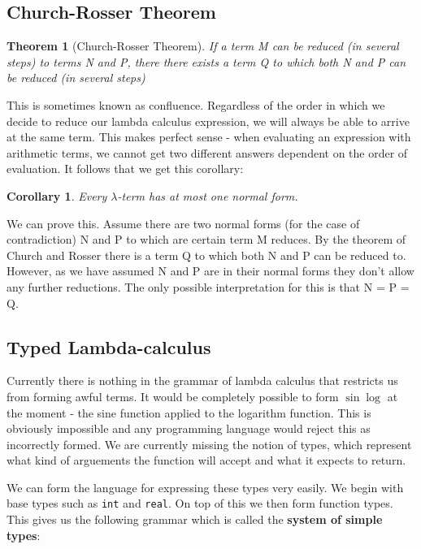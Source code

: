 \documentclass[11pt]{article}
\newtheorem{theorem}{Theorem}
\newtheorem{corollary}{Corollary}
\begin{document}
	
	\subsection{Church-Rosser Theorem}
	\begin{theorem}[Church-Rosser Theorem]
	If a term M can be reduced (in several steps) to terms N and P, there there exists a term Q to which both N and P can be reduced (in several steps)
	\end{theorem}

	\par This is sometimes known as confluence. Regardless of the order in which we decide to reduce our lambda calculus expression, we will always be able to arrive at the same term. This makes perfect sense - when evaluating an expression with arithmetic terms, we cannot get two different answers dependent on the order of evaluation. It follows that we get this corollary:	
	
	\begin{corollary}
	Every $\lambda$-term has at most one normal form.
	\end{corollary}
	
	\par
	We can prove this. Assume there are two normal forms (for the case of contradiction) N and P to which are certain term M reduces. By the theorem of Church and Rosser there is a term Q to which both N and P can be reduced to. However, as we have assumed N and P are in their normal forms they don't allow any further reductions. The only possible interpretation for this is that N = P = Q.
	
	\subsection{Typed Lambda-calculus}
	Currently there is nothing in the grammar of lambda calculus that restricts us from forming awful terms. It would be completely possible to form $\sin \log$ at the moment - the sine function applied to the logarithm function. This is obviously impossible and any programming language would reject this as incorrectly formed. We are currently missing the notion of types, which represent what kind of arguements the function will accept and what it expects to return.
	
	\par 
	We can form the language for expressing these types very easily. We begin with base types such as \texttt{int} and \texttt{real}. On top of this we then form function types. This gives us the following grammar which is called the \textbf{system of simple types}:
	
\end{document}

